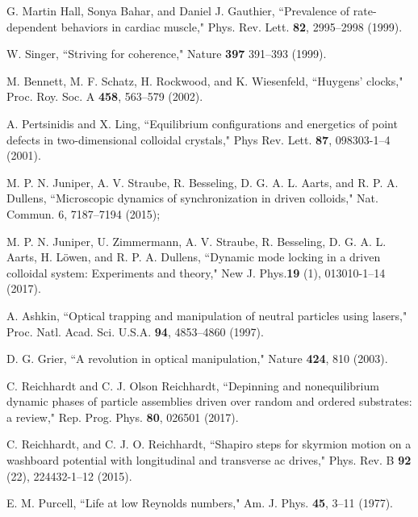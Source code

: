 \documentclass[preprint,showpacs,preprintnumbers,amsmath,amssymb,aps,prb]{revtex4-1}
\theoremstyle{remark}
\begin{document}
\begin{thebibliography}{99}
   G. Martin Hall, Sonya Bahar, and Daniel J. Gauthier, ``Prevalence of rate-dependent behaviors in cardiac muscle," Phys. Rev. Lett. {\bf 82}, 2995--2998 (1999).

   W. Singer, ``Striving for coherence,"  Nature {\bf 397} 391--393 (1999).

   M. Bennett, M. F. Schatz, H. Rockwood, and K. Wiesenfeld, ``Huygens' clocks," Proc. Roy. Soc. A {\bf 458}, 563–579 (2002).

    
   A. Pertsinidis and X. Ling,  ``Equilibrium configurations and energetics of point defects in two-dimensional colloidal crystals," Phys Rev. Lett.  {\bf 87}, 098303-1--4 (2001). %

   M. P. N. Juniper, A. V. Straube, R. Besseling, D. G. A. L. Aarts, and R. P. A. Dullens, ``Microscopic dynamics of synchronization in driven colloids," Nat. Commun. 6, 7187--7194 (2015); 
      
   M. P. N. Juniper,  U. Zimmermann, A. V. Straube, R. Besseling, D. G. A. L. Aarts, H. L{\"o}wen, and R. P. A. Dullens,  ``Dynamic mode locking in a driven colloidal system: Experiments and theory," New J. Phys.{\bf 19} (1), 013010-1--14 (2017).  %

   A. Ashkin, ``Optical trapping and manipulation of neutral particles using lasers," Proc. Natl. Acad. Sci. U.S.A. {\bf 94}, 4853--4860 (1997).

   D. G. Grier, ``A revolution in optical manipulation," Nature {\bf 424}, 810 (2003).

   C. Reichhardt and C. J. Olson Reichhardt, ``Depinning and nonequilibrium dynamic phases of particle assemblies driven over random and ordered substrates: a review," Rep. Prog. Phys. {\bf 80}, 026501 (2017).

   C. Reichhardt, and C. J. O. Reichhardt,  ``Shapiro steps for skyrmion motion on a washboard potential with longitudinal and transverse ac drives," Phys. Rev. B {\bf 92} (22), 224432-1--12 (2015).      

   E. M. Purcell, ``Life at low Reynolds numbers,"  Am. J. Phys. {\bf 45}, 3--11 (1977).
  

\end{thebibliography}
\end{document}
